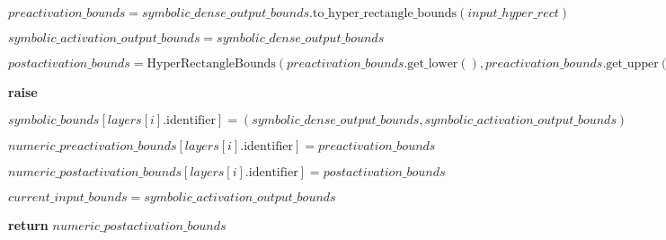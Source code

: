 \begin{algorithm}[t!]
\begin{algorithmic}[1]
            			\State $preactivation\_bounds = symbolic\_dense\_output\_bounds.\text{to\_hyper\_rectangle\_bounds}(input\_hyper\_rect)$
            
            			\State $symbolic\_activation\_output\_bounds = symbolic\_dense\_output\_bounds$
            
            			\State $postactivation\_bounds = \text{HyperRectangleBounds}(preactivation\_bounds.\text{get\_lower}(), preactivation\_bounds.\text{get\_upper}())$
            
        				\Else
            				\State \textbf{raise}             
        			\EndIf
        
        			\State $symbolic\_bounds[layers[i].\text{identifier}] = (symbolic\_dense\_output\_bounds, symbolic\_activation\_output\_bounds)$
        
        			\State $numeric\_preactivation\_bounds[layers[i].\text{identifier}] = preactivation\_bounds$
        
        			\State $numeric\_postactivation\_bounds[layers[i].\text{identifier}] = postactivation\_bounds$
        
        			\State $current\_input\_bounds = symbolic\_activation\_output\_bounds$
        
    		\EndFor
    
    		\State \textbf{return} $numeric\_postactivation\_bounds$
    
	\EndFunction
\end{algorithmic}
\end{algorithm}




